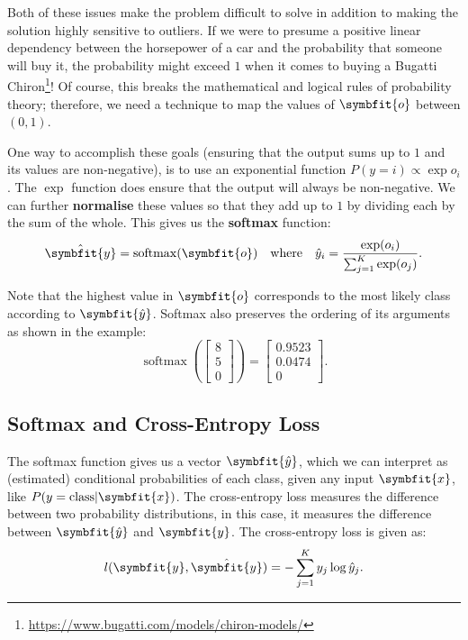 Both of these issues make the problem difficult to solve in addition to making the solution highly sensitive to outliers. If we were to presume a positive linear dependency between the horsepower of a car and the probability that someone will buy it, the probability might exceed $1$ when it comes to buying a Bugatti Chiron\footnote{\url{https://www.bugatti.com/models/chiron-models/}}! Of course, this breaks the mathematical and logical rules of probability theory; therefore, we need a technique to map the values of $\symbfit{o}$ between $(0, 1)$.

One way to accomplish these goals (ensuring that the output sums up to $1$ and its values are non-negative), is to use an exponential function $P(y = i) \propto \exp o_i$. The $\exp$ function does ensure that the output will always be non-negative. We can further \textbf{normalise} these values so that they add up to $1$ by dividing each by the sum of the whole. This gives us the \textbf{softmax} function:
\begin{equation}
    \hat{\symbfit{y}} = \operatorname{softmax}(\symbfit{o}) \quad \text{where}\quad \hat{y}_i = \frac{\exp(o_i)}{\sum_{j=1}^{K} \exp(o_j)}.
    \label{eqn:std-softmax}
\end{equation}

Note that the highest value in $\symbfit{o}$ corresponds to the most likely class according to $\symbfit{\hat{y}}$. Softmax also preserves the ordering of its arguments as shown in the example:
\begin{equation}
    \nonumber
    \operatorname{softmax} \left(\begin{bmatrix}
    8\\
    5\\
    0
    \end{bmatrix}\right)
    = 
    \begin{bmatrix}
    0.9523\\
    0.0474\\
    0
    \end{bmatrix}.
\end{equation}

\subsection{Softmax and Cross-Entropy Loss}\label{ssec:ce-loss}

The softmax function gives us a vector $\symbfit{\hat{y}}$, which we can interpret as (estimated) conditional probabilities of each class, given any input $\symbfit{x}$, like $P(y=\text{class} | \symbfit{x})$. 
The cross-entropy loss measures the difference between two probability distributions, in this case, it measures the difference between $\symbfit{\hat{y}}$ and $\symbfit{y}$. The cross-entropy loss is given as:
\begin{equation}\label{eqn:ce-loss}
    l(\symbfit{y}, \hat{\symbfit{y}}) = - \sum_{j=1}^K y_j \log \hat{y}_j.
\end{equation}

